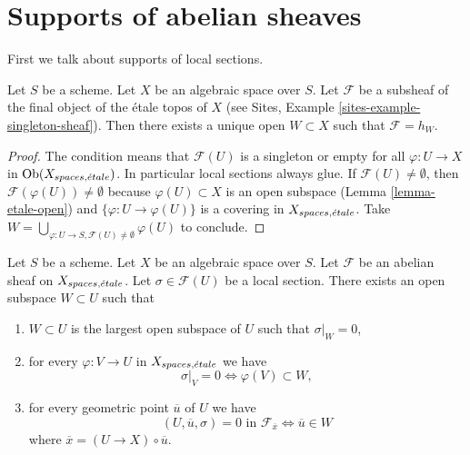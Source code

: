 \section{Supports of abelian sheaves}
\label{section-support}

\noindent
First we talk about supports of local sections.

\begin{lemma}
\label{lemma-support-subsheaf-final}
Let $S$ be a scheme. Let $X$ be an algebraic space over $S$.
Let $\mathcal{F}$ be a subsheaf of the final object of the \'etale
topos of $X$ (see
Sites, Example \ref{sites-example-singleton-sheaf}).
Then there exists a unique open
$W \subset X$ such that $\mathcal{F} = h_W$.
\end{lemma}

\begin{proof}
The condition means that $\mathcal{F}(U)$ is a singleton or
empty for all $\varphi : U \to X$ in $\mathop{\mathrm{Ob}}\nolimits(X_{spaces, {\acute{e}tale}})$.
In particular local sections always glue. If
$\mathcal{F}(U) \not = \emptyset$, then
$\mathcal{F}(\varphi(U)) \not = \emptyset$ because
$\varphi(U) \subset X$ is an open subspace
(Lemma \ref{lemma-etale-open})
and
$\{\varphi : U \to \varphi(U)\}$ is a covering in $X_{spaces, {\acute{e}tale}}$.
Take
$W = \bigcup_{\varphi : U \to S, \mathcal{F}(U) \not = \emptyset} \varphi(U)$
to conclude.
\end{proof}

\begin{lemma}
\label{lemma-zero-over-image}
Let $S$ be a scheme.
Let $X$ be an algebraic space over $S$.
Let $\mathcal{F}$ be an abelian sheaf on $X_{spaces, {\acute{e}tale}}$.
Let $\sigma \in \mathcal{F}(U)$ be a local section.
There exists an open subspace $W \subset U$ such that
\begin{enumerate}
\item $W \subset U$ is the largest open subspace of $U$ such
that $\sigma|_W = 0$,
\item for every $\varphi : V \to U$ in $X_{spaces, {\acute{e}tale}}$ we have
$$
\sigma|_V = 0 \Leftrightarrow \varphi(V) \subset W,
$$
\item for every geometric point $\overline{u}$ of $U$ we have
$$
(U, \overline{u}, \sigma) = 0\text{ in }\mathcal{F}_{\overline{x}}
\Leftrightarrow
\overline{u} \in W
$$
where $\overline{x} = (U \to X) \circ \overline{u}$.
\end{enumerate}
\end{lemma}

